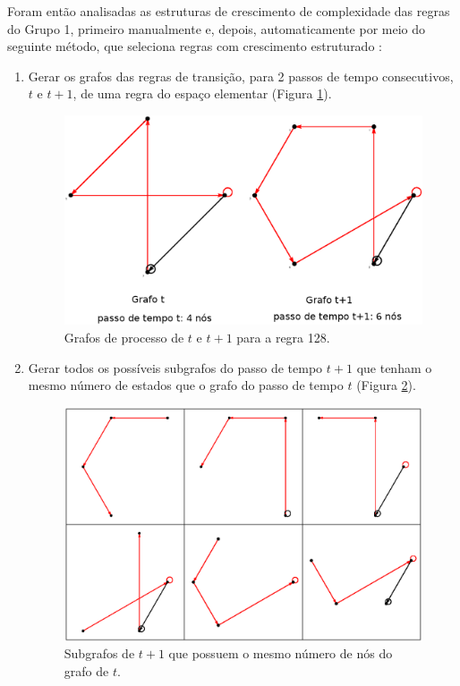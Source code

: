 \documentclass[12pt,a4paper]{article}
\begin{document}
Foram então analisadas as estruturas de crescimento de complexidade das regras
do Grupo 1, primeiro manualmente e, depois, automaticamente por meio do
seguinte método, que seleciona regras com crescimento
estruturado :

\begin{enumerate}\label{sec:mikialgo}
\item Gerar os grafos das regras de transição, para 2 passos de tempo
    consecutivos, $t$ e $t+1$, de uma regra do espaço elementar
    (Figura \ref{fig:grapht}).

\begin{figure}[H]
\begin{center}
\includegraphics[scale=0.3]{img/GraphT.eps}
\caption{Grafos de processo de $t$ e $t+1$ para a regra 128.}
\label{fig:grapht}
\end{center}
\end{figure}

\item Gerar todos os possíveis subgrafos do passo de tempo $t+1$ que tenham
o mesmo número de estados que o grafo do passo de tempo $t$
(Figura \ref{fig:subgraph}).

\begin{figure}[H]
\begin{center}
\includegraphics[scale=0.7]{img/SubGraph.eps}
\caption{Subgrafos de $t+1$ que possuem o mesmo número de nós do grafo de $t$.}
\label{fig:subgraph}
\end{center}
\end{figure}


\end{enumerate}
\end{document}
